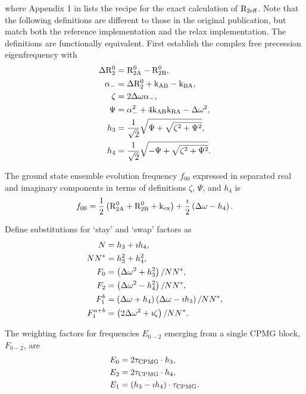 where Appendix 1 in \citet{Baldwin2014} lists the recipe for the exact calculation of $\mathrm{R}_{\textrm{2eff}}$.
Note that the following definitions are different to those in the original publication, but match both the reference implementation and the relax implementation.
The definitions are functionally equivalent.
First establish the complex free precession eigenfrequency with
\begin{subequations}
\begin{align}
	\Delta \mathrm{R}_2^0 & = \mathrm{R}_{\mathrm{2A}}^0 - \mathrm{R}_{\mathrm{2B}}^0 , \\
	\alpha_- & = \Delta \mathrm{R}_2^0 + \textrm{k}_{\textrm{AB}} - \textrm{k}_{\textrm{BA}} , \\
	\zeta & = 2 \Delta\omega \alpha_- , \\
	\Psi & = \alpha_-^2 + 4 \textrm{k}_{\textrm{AB}} \textrm{k}_{\textrm{BA}} - \Delta\omega^2 , \\
	h_3 &= \frac{1}{\sqrt{2}}\sqrt{\Psi + \sqrt{\zeta^2 + \Psi^2} } , \\
    h_4 &= \frac{1}{\sqrt{2}}\sqrt{-\Psi + \sqrt{\zeta^2 + \Psi^2} } .
\end{align}
\end{subequations}

The ground state ensemble evolution frequency $f_{00}$ expressed in separated real and imaginary components in terms of definitions $\zeta$, $\Psi$, and $h_4$ is
\begin{equation}
	f_{00} = \frac{1}{2}\left(\mathrm{R}_{\mathrm{2A}}^0 + \mathrm{R}_{\mathrm{2B}}^0 + \textrm{k}_{\textrm{ex}}\right) + \frac{\imath}{2}\left(\Delta\omega - h_4\right) .
\end{equation}

Define substitutions for `stay' and `swap' factors as
\begin{subequations}
\begin{align}
	N & = h_3 + \imath h_4 , \\
	NN^* & = h_3^2 + h_4^2 , \\
	F_0 & = \left(\Delta\omega^2 + h_3^2\right) / NN^* , \\
	F_2 & = \left(\Delta\omega^2 - h_4^2\right) / NN^* , \\
	F_1^b & = \left(\Delta\omega + h_4\right) \left(\Delta\omega - \imath h_3\right) / NN^* , \\
	F_1^{a+b} & = \left(2\Delta\omega^2 + \imath \zeta\right) / NN^* .
\end{align}
\end{subequations}

The weighting factors for frequencies $E_{0-2}$ emerging from a single CPMG block, $F_{0-2}$, are
\begin{subequations}
\begin{align}
	E_0 & =  2 \tau_{\textrm{CPMG}} \cdot h_3 , \\
	E_2 & =  2 \tau_{\textrm{CPMG}} \cdot  h_4 , \\
	E_1 & = (h_3 - \imath h_4) \cdot \tau_{\textrm{CPMG}} .
\end{align}
\end{subequations}

